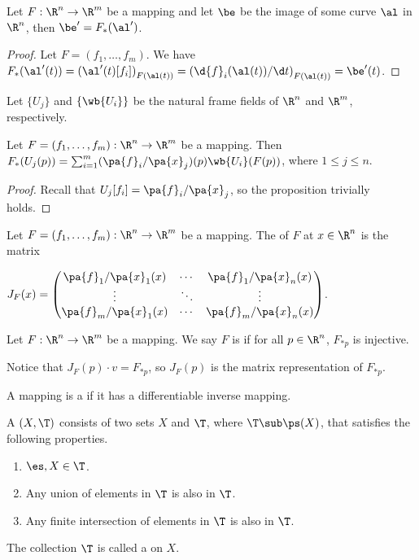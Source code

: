 \documentclass[10pt]{article}
\begin{document}
\begin{proposition}
    Let $F:{\R}^{n}\to{\R}^{m}$ be a mapping and let $\be$ be the image of some curve $\al$ in ${\R}^{n}$, then $\be'={F}_{*}(\al')$.
\end{proposition}
\begin{proof}
    Let $F=({f}_{1},\dots,{f}_{m})$. We have ${F}_{*}(\al'(t))={(\al'(t)[{f}_{i}])}_{F(\al(t))}={(\d{f}_{i}(\al(t))/\d t)}_{F(\al(t))}=\be'(t)$.
\end{proof}
\par
Let $\{{U}_{j}\}$ and $\{\wb{{U}_{i}}\}$ be the natural frame fields of ${\R}^{n}$ and ${\R}^{m}$, respectively.
\begin{proposition}
    Let $F=({f}_{1},\dots,{f}_{m}):{\R}^{n}\to{\R}^{m}$ be a mapping. Then ${F}_{*}({U}_{j}(p))={\sum}_{i=1}^{m}(\pa{f}_{i}/\pa{x}_{j})(p)\wb{{U}_{i}}(F(p))$, where $1\le j\le n$.
\end{proposition}
\begin{proof}
    Recall that ${U}_{j}[{f}_{i}]=\pa{f}_{i}/\pa{x}_{j}$, so the proposition trivially holds.
\end{proof}
\begin{definition}
    Let $F=({f}_{1},\dots,{f}_{m}):{\R}^{n}\to{\R}^{m}$ be a mapping. The  of $F$ at $x\in{\R}^{n}$ is the matrix
    \begin{center}
        ${J}_{F}(x)=\begin{pmatrix}
            \pa{f}_{1}/\pa{x}_{1}(x) & \cdots & \pa{f}_{1}/\pa{x}_{n}(x) \\
            \vdots & \ddots & \vdots \\
            \pa{f}_{m}/\pa{x}_{1}(x) & \cdots & \pa{f}_{m}/\pa{x}_{n}(x)
        \end{pmatrix}$.
    \end{center}
\end{definition}
\begin{definition}
    Let $F:{\R}^{n}\to{\R}^{m}$ be a mapping. We say $F$ is  if for all $p\in{\R}^{n}$, ${F}_{*p}$ is injective.
\end{definition}
\par
Notice that ${J}_{F}(p)\cdot v={F}_{*p}$, so ${J}_{F}(p)$ is the matrix representation of ${F}_{*p}$.
\begin{definition}
    A mapping is a  if it has a differentiable inverse mapping.
\end{definition}
\begin{definition}
    A  $(X,\T)$ consists of two sets $X$ and $\T$, where $\T\sub\ps(X)$, that satisfies the following properties.
    \begin{enumerate}
        \item $\es,X\in\T$.
        \item Any union of elements in $\T$ is also in $\T$.
        \item Any finite intersection of elements in $\T$ is also in $\T$.
    \end{enumerate}
    The collection $\T$ is called a  on $X$.
\end{definition}
\end{document}
